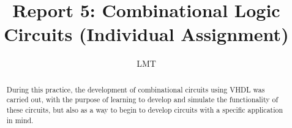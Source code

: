\documentclass{article}
\begin{document}
\renewcommand{\footrulewidth}{1pt}
\renewcommand{\tablename}{Tabla}
\author{}%
\title{Report 5: Combinational Logic Circuits (Individual Assignment)}%
\date{LMT}%
\maketitle
\begin{abstract}
During this practice, the development of combinational circuits using VHDL was carried out, with the purpose of learning
to develop and simulate the functionality of these circuits, but also as a way to begin to develop circuits with a specific application in mind.
\end{abstract}
\end{document}
